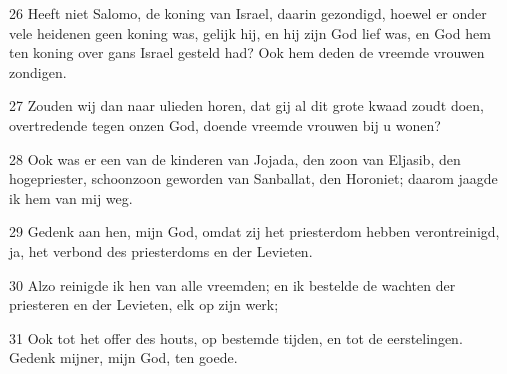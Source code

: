 \par 26 Heeft niet Salomo, de koning van Israel, daarin gezondigd, hoewel er onder vele heidenen geen koning was, gelijk hij, en hij zijn God lief was, en God hem ten koning over gans Israel gesteld had? Ook hem deden de vreemde vrouwen zondigen.
\par 27 Zouden wij dan naar ulieden horen, dat gij al dit grote kwaad zoudt doen, overtredende tegen onzen God, doende vreemde vrouwen bij u wonen?
\par 28 Ook was er een van de kinderen van Jojada, den zoon van Eljasib, den hogepriester, schoonzoon geworden van Sanballat, den Horoniet; daarom jaagde ik hem van mij weg.
\par 29 Gedenk aan hen, mijn God, omdat zij het priesterdom hebben verontreinigd, ja, het verbond des priesterdoms en der Levieten.
\par 30 Alzo reinigde ik hen van alle vreemden; en ik bestelde de wachten der priesteren en der Levieten, elk op zijn werk;
\par 31 Ook tot het offer des houts, op bestemde tijden, en tot de eerstelingen. Gedenk mijner, mijn God, ten goede.



